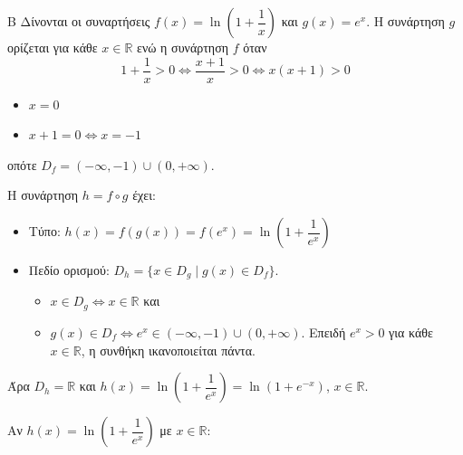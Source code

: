 \begin{thema}{Β}
Δίνονται οι συναρτήσεις $f(x)=\ln\!\left(1+\dfrac{1}{x}\right)$ και $g(x)=e^x$. Η συνάρτηση $g$ ορίζεται για κάθε $x\in\mathbb{R}$ ενώ η συνάρτηση $f$ όταν
\[1+\frac{1}{x}>0\Leftrightarrow \frac{x+1}{x}>0\Leftrightarrow x(x+1)>0\]
\begin{itemize}
\item $x=0$
\item $x+1=0\Leftrightarrow x=-1$
\end{itemize}
\begin{center}
\end{center}
οπότε $D_f=(-\infty,-1)\cup (0,+\infty)$.
\begin{erwthma}
\item Η συνάρτηση $h=f\circ g$ έχει:
\begin{itemize}
    \item Τύπο: $h(x)=f(g(x))=f(e^x)=\ln\!\left(1+\dfrac{1}{e^x}\right)$
    \item Πεδίο ορισμού: $D_h=\{x\in D_g\mid g(x)\in D_f\}$.
    \begin{itemize}[label=\tiny\faPlay]
        \item $x\in D_g\Leftrightarrow x\in\mathbb{R}$ και
        \item $g(x)\in D_f\Leftrightarrow e^x\in(-\infty,-1)\cup(0,+\infty)$. Επειδή $e^x>0$ για κάθε $x\in\mathbb{R}$, η συνθήκη ικανοποιείται πάντα.
    \end{itemize}
\end{itemize}
Άρα $D_h=\mathbb{R}$ και $h(x)=\ln\!\left(1+\dfrac{1}{e^x}\right)=\ln\!\left(1+e^{-x}\right)$, $x\in\mathbb{R}$.

\end{erwthma}

Αν $h(x)=\ln\!\left(1+\dfrac{1}{e^x}\right)$ με $x\in\mathbb{R}$:

\begin{erwthma}[resume]


\end{erwthma}
\end{thema}
